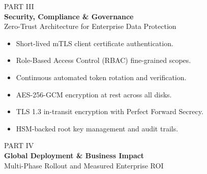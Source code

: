 \documentclass[landscape,20pt]{foils}
\begin{document}
\foilhead{}
\begin{tcolorbox}[darkcard, height=0.80\textheight, halign=center, valign=center]
  {\Huge \textcolor{TealAccent}{PART III}} \\[14pt]
  {\Huge \bfseries Security, Compliance \& Governance} \\[12pt]
  {\Large Zero-Trust Architecture for Enterprise Data Protection}
\end{tcolorbox}

\foilhead{\textcolor{NavyDark}{\faLock\ Zero-Trust Security Architecture}}
\vspace{2pt}
\begin{minipage}[t]{0.48\textwidth}
  \begin{tcolorbox}[slidecard, title=\large \faKey\ Identity \& Access Management]
    \begin{itemize}
      \item Short-lived mTLS client certificate authentication.
      \item Role-Based Access Control (RBAC) fine-grained scopes.
      \item Continuous automated token rotation and verification.
    \end{itemize}
  \end{tcolorbox}
\end{minipage}%
\hfill
\begin{minipage}[t]{0.48\textwidth}
  \begin{tcolorbox}[slidecard, title=\large \faLock\ Data Protection \& Encryption]
    \begin{itemize}
      \item AES-256-GCM encryption at rest across all disks.
      \item TLS 1.3 in-transit encryption with Perfect Forward Secrecy.
      \item HSM-backed root key management and audit trails.
    \end{itemize}
  \end{tcolorbox}
\end{minipage}

\foilhead{}
\begin{tcolorbox}[darkcard, height=0.80\textheight, halign=center, valign=center]
  {\Huge \textcolor{TealAccent}{PART IV}} \\[14pt]
  {\Huge \bfseries Global Deployment \& Business Impact} \\[12pt]
  {\Large Multi-Phase Rollout and Measured Enterprise ROI}
\end{tcolorbox}
\end{document}
